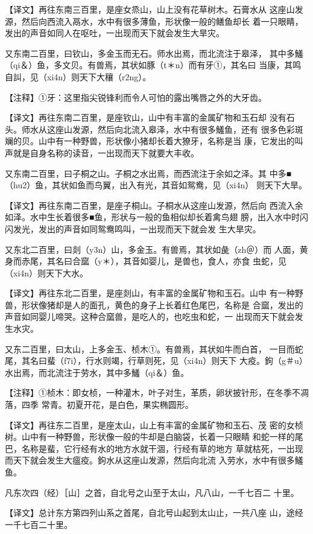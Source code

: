 \documentclass[a4paper,12pt,UTF8,twoside]{ctexbook}
\begin{document}
【译文】再往东南三百里，是座女烝山，山上没有花草树木。石膏水从 这座山发源，然后向西流入鬲水，水中有很多薄鱼，形状像一般的鳝鱼却长 着一只眼睛，发出的声音如同人在呕吐，一出现而天下就会发生大旱灾。

又东南二百里，曰钦山，多金玉而无石。师水出焉，而北流注于皋泽， 其中多鱃（qi＆）鱼，多文贝。有兽焉，其状如豚（t＊n）而有牙①，其名曰 当康，其鸣自訆，见（xi4n）则天下大穰（r2ng）。

【注释】①牙：这里指尖锐锋利而令人可怕的露出嘴唇之外的大牙齿。

【译文】再往东南二百里，是座钦山，山中有丰富的金属矿物和玉石却 没有石头。师水从这座山发源，然后向北流入皋泽，水中有很多鱃鱼，还有 很多色彩斑斓的贝。山中有一种野兽，形状像小猪却长着大獠牙，名称是当 康，它发出的叫声就是自身名称的读音，一出现而天下就要大丰收。

又东南二百里，曰子桐之山。子桐之水出焉，而西流注于余如之泽。其 中多■（hu2）鱼，其状如鱼而鸟翼，出入有光，其音如鸳鸯，见（xi4n） 则天下大旱。

【译文】再往东南二百里，是座子桐山。子桐水从这座山发源，然后向 西流入余如泽。水中生长着很多■鱼，形状与一般的鱼相似却长着禽鸟翅 膀，出入水中时闪闪发光，发出的声音如同鸳鸯鸣叫，一出现而天下就会发 生大旱灾。

又东北二百里，曰剡（y3n）山，多金玉。有兽焉，其状如彘（zh＠）而 人面，黄身而赤尾，其名曰合窳（y＊），其音如婴儿，是兽也，食人，亦食 虫蛇，见（xi4n）则天下大水。

【译文】再往东北二百里，是座剡山，有丰富的金属矿物和玉石。山中 有一种野兽，形状像猪却是人的面孔，黄色的身子上长着红色尾巴，名称是 合窳，发出的声音如同婴儿啼哭。这种合窳兽，是吃人的，也吃虫和蛇，一 出现而天下就会发生水灾。

又东二百里，曰太山，上多金玉、桢木①。有兽焉，其状如牛而白首， 一目而蛇尾，其名曰蜚（f7i），行水则竭，行草则死，见（xi4n）则天下 大疫。鉤（g＃u）水出焉，而北流注于劳水，其中多鱃（qi＆）鱼。

【注释】①桢木：即女桢，一种灌木，叶子对生，革质，卵状披针形，在冬季不凋落，四季 常青。初夏开花，是白色，果实椭圆形。

【译文】再往东二百里，是座太山，山上有丰富的金属矿物和玉石、茂 密的女桢树。山中有一种野兽，形状像一般的牛却是白脑袋，长着一只眼睛 和蛇一样的尾巴，名称是蜚，它行经有水的地方水就干涸，行经有草的地方 草就枯死，一出现而天下就会发生大瘟疫。鉤水从这座山发源，然后向北流 入劳水，水中有很多鱃鱼。

凡东次四（经）［山］之首，自北号之山至于太山，凡八山，一千七百二 十里。

【译文】总计东方第四列山系之首尾，自北号山起到太山止，一共八座 山，途经一千七百二十里。
\end{document}
